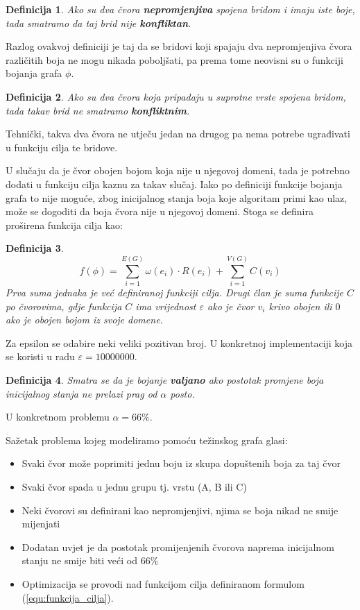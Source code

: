 \documentclass[times, utf8, diplomski, numeric]{fer}
\newtheorem{definition}{Definicija}
\begin{document}
\begin{definition}
Ako su dva čvora \textbf{nepromjenjiva} spojena bridom i imaju iste boje, tada smatramo da taj brid nije \textbf{konfliktan}.
\end{definition}

Razlog ovakvoj definiciji je taj da se bridovi koji spajaju dva nepromjenjiva čvora različitih boja ne mogu nikada poboljšati, pa prema tome neovisni su o funkciji bojanja grafa $\phi$.

\begin{definition}
Ako su dva čvora koja pripadaju u suprotne vrste spojena bridom, tada takav brid ne smatramo \textbf{konfliktnim}.
\end{definition}

Tehnički, takva dva čvora ne utječu jedan na drugog pa nema potrebe  ugrađivati u funkciju cilja te bridove.

U slučaju da je čvor obojen bojom koja nije u njegovoj domeni, tada je potrebno dodati u funkciju cilja kaznu za takav slučaj. Iako po definiciji funkcije bojanja grafa to nije moguće, zbog inicijalnog stanja boja koje algoritam primi kao ulaz, može se dogoditi da boja čvora nije u njegovoj domeni. Stoga se definira proširena funkcija cilja kao:

\begin{definition}
\begin{equation}
\label{equ:funkcija_cilja}
f(\phi) = \sum_{i=1}^{E(G)} \omega(e_i) \cdot R(e_i) + \sum_{i=1}^{V(G)} C(v_i)
\end{equation}
Prva suma jednaka je već definiranoj funkciji cilja. Drugi član je suma funkcije $C$ po čvorovima, gdje funkcija $C$ ima vrijednost $\varepsilon$ ako je čvor $v_i$ krivo obojen ili $0$ ako je obojen bojom iz svoje domene.
\end{definition}

Za epsilon se odabire neki veliki pozitivan broj. U konkretnoj implementaciji koja se koristi u radu $\varepsilon=10000000$.

\begin{definition}
Smatra se da je bojanje \textbf{valjano} ako postotak promjene boja inicijalnog stanja ne prelazi prag od $\alpha$ posto.
\end{definition}

U konkretnom problemu $\alpha=66\%$.

Sažetak problema kojeg modeliramo pomoću težinskog grafa glasi:
\begin{itemize}
	\item Svaki čvor može poprimiti jednu boju iz skupa dopuštenih boja za taj čvor
	\item Svaki čvor spada u jednu grupu tj. vrstu (A, B ili C)
	\item Neki čvorovi su definirani kao nepromjenjivi, njima se boja nikad ne smije mijenjati
	\item Dodatan uvjet je da postotak promijenjenih čvorova naprema inicijalnom stanju ne smije biti veći od 66\%
	\item Optimizacija se provodi nad funkcijom cilja definiranom formulom (\ref{equ:funkcija_cilja}).
\end{itemize}
\end{document}
